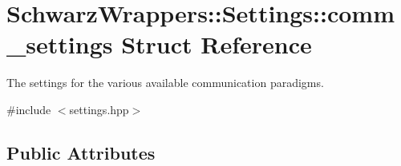 \hypertarget{structSchwarzWrappers_1_1Settings_1_1comm__settings}{}\section{Schwarz\+Wrappers\+:\+:Settings\+:\+:comm\+\_\+settings Struct Reference}
\label{structSchwarzWrappers_1_1Settings_1_1comm__settings}


The settings for the various available communication paradigms.  




{\ttfamily \#include $<$settings.\+hpp$>$}

\subsection*{Public Attributes}
